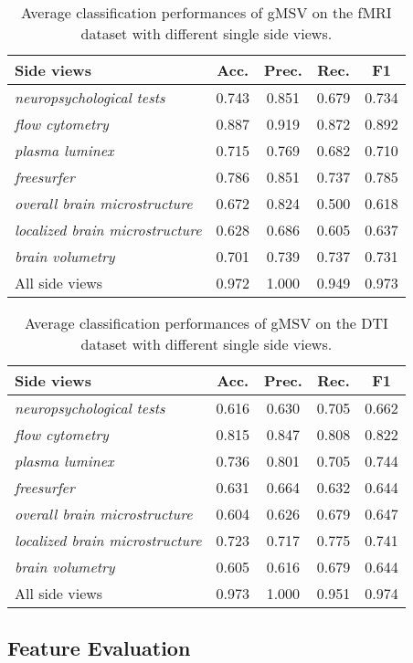 \documentclass[conference]{IEEEtran}
\newcommand{\galgo}[0]{gMSV}
\newcommand{\neu}[0]{\emph{neuropsychological tests}}
\newcommand{\flo}[0]{\emph{flow cytometry}}
\newcommand{\pla}[0]{\emph{plasma luminex}}
\newcommand{\fre}[0]{\emph{freesurfer}}
\newcommand{\ave}[0]{\emph{overall brain microstructure}}
\newcommand{\dti}[0]{\emph{localized brain microstructure}}
\newcommand{\seg}[0]{\emph{brain volumetry}}
\begin{document}
\begin{table}
\caption{Average classification performances of {\galgo} on the fMRI dataset with different single side views.}
\small
\label{tab:result3}
\centering
\begin{tabular}{lcccc}
\toprule%
Side views	&Acc. &Prec. &Rec. &F1\\
\midrule %
{\neu}	&0.743 &0.851 &0.679 &0.734\\
{\flo}	&0.887 &0.919 &0.872 &0.892\\
{\pla}	&0.715 &0.769 &0.682 &0.710\\
{\fre}	&0.786 &0.851 &0.737 &0.785\\
{\ave}	&0.672 &0.824 &0.500 &0.618\\
{\dti}	&0.628 &0.686 &0.605 &0.637\\
{\seg}	&0.701 &0.739 &0.737 &0.731\\
\midrule %
All side views	&0.972 &1.000 &0.949 &0.973\\
\bottomrule%
\end{tabular}
\end{table}\begin{table}
\caption{Average classification performances of {\galgo} on the DTI dataset with different single side views.}
\small
\label{tab:result4}
\centering
\begin{tabular}{lcccc}
\toprule%
Side views	&Acc. &Prec. &Rec. &F1\\
\midrule %
{\neu}	&0.616 &0.630 &0.705 &0.662\\
{\flo}	&0.815 &0.847 &0.808 &0.822\\
{\pla}	&0.736 &0.801 &0.705 &0.744\\
{\fre}	&0.631 &0.664 &0.632 &0.644\\
{\ave}	&0.604 &0.626 &0.679 &0.647\\
{\dti}	&0.723 &0.717 &0.775 &0.741\\
{\seg}	&0.605 &0.616 &0.679 &0.644\\
\midrule %
All side views	&0.973 &1.000 &0.951 &0.974\\
\bottomrule%
\end{tabular}
\end{table}\subsection{Feature Evaluation}
\end{document}
